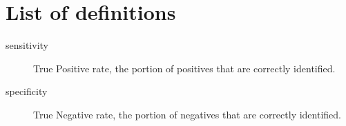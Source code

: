 \chapter*{List of definitions}
\begin{description}
\item[sensitivity] True Positive rate, the portion of positives that are correctly identified.
\item[specificity] True Negative rate, the portion of negatives that are correctly identified.
\end{description}